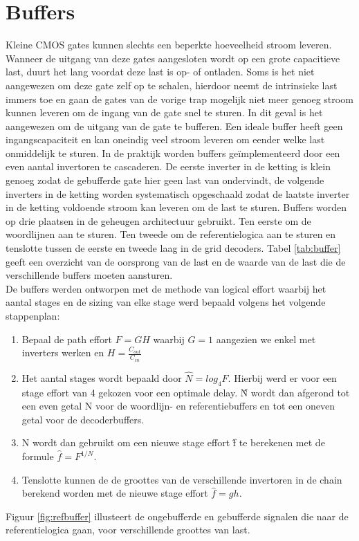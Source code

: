 \section{Buffers}
Kleine CMOS gates kunnen slechts een beperkte hoeveelheid stroom leveren. Wanneer de uitgang van deze gates aangesloten wordt op een grote capacitieve last, duurt het lang voordat deze last is op- of ontladen. Soms is het niet aangewezen om deze gate zelf op te schalen, hierdoor neemt de intrinsieke last immers toe en gaan de gates van de vorige trap mogelijk niet meer genoeg stroom kunnen leveren om de ingang van de gate snel te sturen. In dit geval is het aangewezen om de uitgang van de gate te bufferen. Een ideale buffer heeft geen ingangscapaciteit en kan oneindig veel stroom leveren om eender welke last onmiddelijk te sturen. In de praktijk worden buffers geïmplementeerd door een even aantal invertoren te cascaderen. De eerste inverter in de ketting is klein genoeg zodat de gebufferde gate hier geen last van ondervindt, de volgende inverters in de ketting worden systematisch opgeschaald zodat de laatste inverter in de ketting voldoende stroom kan leveren om de last te sturen. 
Buffers worden op drie plaatsen in de geheugen architectuur gebruikt. Ten eerste om de woordlijnen aan te sturen. Ten tweede om de referentielogica aan te sturen en tenslotte  tussen de eerste en tweede laag in de grid decoders. Tabel \ref{tab:buffer} geeft een overzicht van de oorsprong van de last en de waarde van de last die de verschillende buffers moeten aansturen.\\
De buffers werden ontworpen met de methode van logical effort waarbij het aantal stages en de sizing van elke stage werd bepaald volgens het volgende stappenplan:
\begin{enumerate}
\item Bepaal de path effort $F = GH$ waarbij $G = 1$ aangezien we enkel met inverters werken en $H = \frac{C_{out}}{C_{in}}$
\item Het aantal stages wordt bepaald door $\hat{N} = log_{4}F$. Hierbij werd er voor een stage effort van 4 gekozen voor een optimale delay\cite{Sutherland:1999:LED:298513}. \^{N} wordt dan afgerond tot een even getal N voor de woordlijn- en referentiebuffers en tot een oneven getal voor de decoderbuffers.
\item N wordt dan gebruikt om een nieuwe stage effort \^{f} te berekenen met de formule $\hat{f} = F^{1/N}$.
\item Tenslotte kunnen de de groottes van de verschillende invertoren in de chain berekend worden met de nieuwe stage effort $\hat{f} = gh$.
\end{enumerate}
Figuur \ref{fig:refbuffer} illusteert de ongebufferde en gebufferde signalen die naar de referentielogica gaan, voor verschillende groottes van last.

